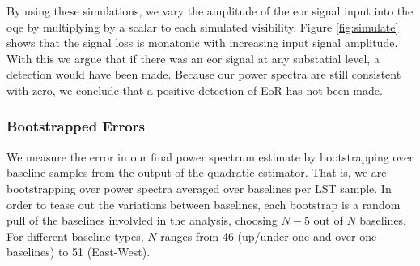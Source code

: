 \documentclass[twocolumn,numberedappendix]{emulateapj} \shorttitle{PSA64}
\begin{document}
By using these simulations, we vary the amplitude of the eor signal input into
the oqe by multiplying by a scalar to each simulated visibility. Figure
\ref{fig:simulate} shows that the signal loss is monatonic with increasing
input signal amplitude. With this we argue that if there was an eor signal at
any substatial level, a detection would have been made. Because our power
spectra are still consistent with zero, we conclude that a positive detection of
EoR has not been made. 




%

\subsubsection{Bootstrapped Errors}
We measure the error in our final power spectrum estimate by bootstrapping over
baseline samples from the output of the quadratic estimator. That is, we are
bootstrapping over power spectra averaged over baselines per LST sample. In order
to tease out the variations between baselines, each bootstrap is a random pull
of the baselines involvled in the analysis, choosing $N-5$ out of $N$
baselines. For different baseline types, $N$ ranges from 46 (up/under one and
over one baselines) to 51 (East-West). 
\end{document}
